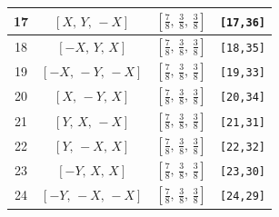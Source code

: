 \documentclass[fleqn,8pt]{jsarticle}
\begin{document}
\begin{longtable}{cccc}
17 & $\left[ X,\, Y,\, - X \right]$ & $\left[ \frac{7}{8},\, \frac{3}{8},\, \frac{3}{8} \right]$ & {\tt [17,36]} \\ \hline
18 & $\left[ - X,\, Y,\, X \right]$ & $\left[ \frac{7}{8},\, \frac{3}{8},\, \frac{3}{8} \right]$ & {\tt [18,35]} \\ \hline
19 & $\left[ - X,\, - Y,\, - X \right]$ & $\left[ \frac{7}{8},\, \frac{3}{8},\, \frac{3}{8} \right]$ & {\tt [19,33]} \\ \hline
20 & $\left[ X,\, - Y,\, X \right]$ & $\left[ \frac{7}{8},\, \frac{3}{8},\, \frac{3}{8} \right]$ & {\tt [20,34]} \\ \hline
21 & $\left[ Y,\, X,\, - X \right]$ & $\left[ \frac{7}{8},\, \frac{3}{8},\, \frac{3}{8} \right]$ & {\tt [21,31]} \\ \hline
22 & $\left[ Y,\, - X,\, X \right]$ & $\left[ \frac{7}{8},\, \frac{3}{8},\, \frac{3}{8} \right]$ & {\tt [22,32]} \\ \hline
23 & $\left[ - Y,\, X,\, X \right]$ & $\left[ \frac{7}{8},\, \frac{3}{8},\, \frac{3}{8} \right]$ & {\tt [23,30]} \\ \hline
24 & $\left[ - Y,\, - X,\, - X \right]$ & $\left[ \frac{7}{8},\, \frac{3}{8},\, \frac{3}{8} \right]$ & {\tt [24,29]} \\
\end{longtable}
\renewcommand{\arraystretch}{1.2}
\end{document}
